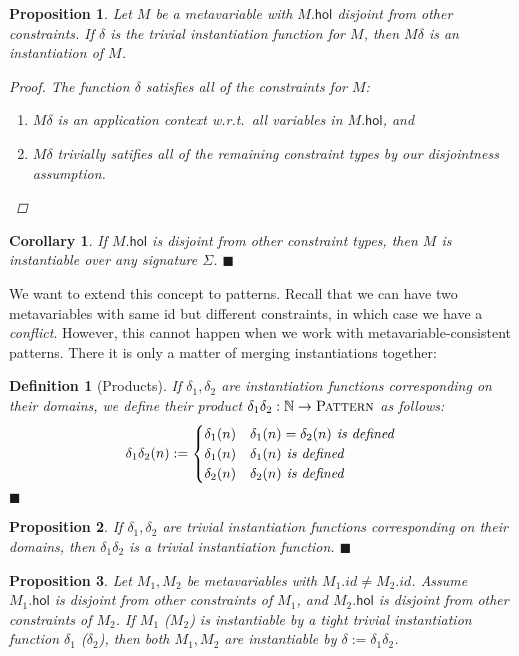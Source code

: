 \documentclass{article}
\newcommand{\xqed}[1]{%
    \leavevmode\unskip\penalty9999 \hbox{}\nobreak\hfill
    \quad\hbox{\ensuremath{#1}}}
\newcommand{\xqedhere}{\xqed{\blacksquare}}
\newtheorem{deff}{Definition}
\newenvironment{definition}[1]{%
  \begin{deff}#1}{%
  \xqedhere\end{deff}%
}
\numberwithin{deff}{section}
\numberwithin{lemma*}{section}
\newtheorem{proposition*}{Proposition}
\newenvironment{proposition}[1]{%
    \begin{proposition*}#1}{%
    \xqedhere\end{proposition*}%
  }
\newtheorem{corollary*}{Corollary}
\newenvironment{corollary}[1]{%
    \begin{corollary*}#1}{%
    \xqedhere\end{corollary*}%
  }
\newcommand{\Nat}{\mathbb{N}}
\newcommand{\Pat}{\textsc{Pattern}}
\newcommand{\wrt}{w.r.t.~}
\newcommand{\Hol}{\mathsf{hol}}
\begin{document}
\begin{proposition*}
  \label{prop:trivial_inst}
  Let $M$ be a metavariable with $M.\Hol$ disjoint from other constraints.
  If $\delta$ is the trivial instantiation function for $M$, then $M\delta$ is an instantiation of $M$.
  \begin{proof}
    The function $\delta$ satisfies all of the constraints for $M$:
    \begin{enumerate}
      \item $M\delta$ is an application context \wrt all variables in $M.\Hol$, and
      \item $M\delta$ trivially satifies all of the remaining constraint types by our disjointness assumption.
    \end{enumerate}
  \end{proof}
\end{proposition*}
\begin{corollary}
  If $M.\Hol$ is disjoint from other constraint types, then $M$ is instantiable over any signature $\Sigma$.
\end{corollary}

We want to extend this concept to patterns.
Recall that we can have two metavariables with same id but different constraints, in which case we have a \emph{conflict}.
However, this cannot happen when we work with metavariable-consistent patterns.
There it is only a matter of merging instantiations together:
\begin{definition}[Products]
  If $\delta_1, \delta_2$ are instantiation functions corresponding on their domains, we define their product $\delta_1 \delta_2 : \Nat \to \Pat$ as follows: \[\delta_1 \delta_2 (n) :=
    \begin{cases}
      \delta_1(n)&\delta_1(n) = \delta_2(n)\emph{ is defined}\\
      \delta_1(n)&\delta_1(n)\emph{ is defined}\\
      \delta_2(n)&\delta_2(n)\emph{ is defined}
    \end{cases}\]
\end{definition}
\begin{proposition}
  \label{prop:product_vs_trivial}
  If $\delta_1, \delta_2$ are trivial instantiation functions corresponding on their domains, then $\delta_1 \delta_2$ is a trivial instantiation function.
\end{proposition}
\begin{proposition*}
  \label{prop:product}
  Let $M_1, M_2$ be metavariables with $M_1.id \neq M_2.id$.
  Assume $M_1.\Hol$ is disjoint from other constraints of $M_1$, and $M_2.\Hol$ is disjoint from other constraints of $M_2$.
  If $M_1$ ($M_2$) is instantiable by a \emph{tight} trivial instantiation function $\delta_1$ ($\delta_2$), then both $M_1, M_2$ are instantiable by $\delta := \delta_1 \delta_2$.
\end{proposition*}
\end{document}
